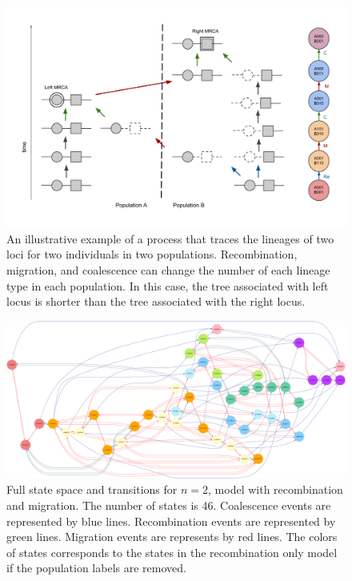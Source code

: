 \documentclass[11pt,oneside]{amsart}
\begin{document}
\begin{figure}[ht]
\centering
\includegraphics[width=1.00\textwidth]{Migration_diagram.png}
\caption{An illustrative example of a process that traces the lineages of two loci for two individuals in two populations. Recombination, migration, and coalescence can change the number of each lineage type in each population. In this case, the tree associated with left locus is shorter than the tree associated with the right locus.}
\label{Figure: migration diagram}
\end{figure}

\begin{figure}[ht]
\centering
\includegraphics[width=\hsize]{n2_mig_color.png}
\caption{Full state space and transitions for $n = 2$, model with recombination and migration. The number of states is 46. Coalescence events are represented by blue lines. Recombination events are represented by green lines. Migration events are represents by red lines. The colors of states corresponds to the states in the recombination only model if the population labels are removed.}
\label{Figure: n = 2 recomb mig}
\end{figure}
\end{document}

